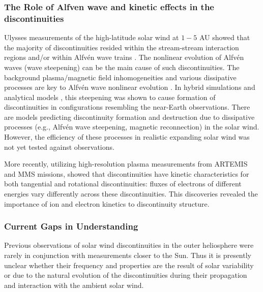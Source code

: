 \documentclass[
  letterpaper,
  DIV=11,
  numbers=noendperiod]{scrartcl}
\begin{document}
\subsubsection{The Role of Alfven wave and kinetic effects in the discontinuities}\label{the-role-of-alfven-wave-and-kinetic-effects-in-the-discontinuities}

Ulysses measurements of the high-latitude solar wind at \(1-5\) AU showed that the majority of discontinuities resided within the stream-stream interaction regions and/or within Alfvén wave trains \citep{tsurutaniInterplanetaryDiscontinuitiesAlfven1995, tsurutaniReviewDiscontinuitiesAlfven1999}. The nonlinear evolution of Alfvén waves (wave steepening) can be the main cause of such discontinuities. The background plasma/magnetic field inhomogeneities and various dissipative processes are key to Alfvén wave nonlinear evolution \citep{Lerche75, Prakash&Diamond99, Medvedev97:prl, Nariyuki14, Yang15}. In hybrid simulations \citep[see][]{Vasquez&Hollweg98, Vasquez&Hollweg01, TenBarge&Howes13} and analytical models \citep[e.g.,][]{Kennel88:jetp, Hada89, Malkov91, Wu&Kennel92, Medvedev97:pop}, this steepening was shown to cause formation of discontinuities in configurations resembling the near-Earth observations. There are models predicting discontinuity formation \citep{Servidio15, Podesta&Roytershteyn17} and destruction \citep{Servidio11,Matthaeus15} due to dissipative processes (e.g., Alfvén wave steepening, magnetic reconnection) in the solar wind. However, the efficiency of these processes in realistic expanding solar wind was not yet tested against observations.

More recently, utilizing high-resolution plasma measurements from ARTEMIS and MMS missions, \citet{artemyevKineticNatureSolar2019} showed that discontinuities have kinetic characteristics for both tangential and rotational discontinuities: fluxes of electrons of different energies vary differently across these discontinuities. This discoveries revealed the importance of ion and electron kinetics to discontinuity structure.

\subsubsection{Current Gaps in Understanding}\label{current-gaps-in-understanding}

Previous observations of solar wind discontinuities in the outer heliosphere were rarely in conjunction with measurements closer to the Sun. Thus it is presently unclear whether their frequency and properties are the result of solar variability or due to the natural evolution of the discontinuities during their propagation and interaction with the ambient solar wind.
\end{document}
